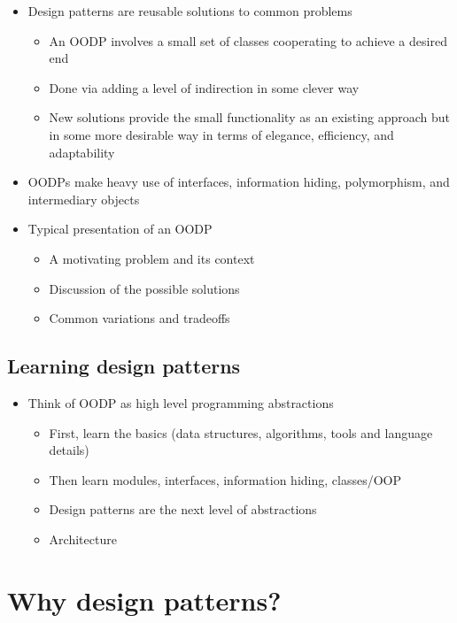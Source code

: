 \documentclass[12pt]{book}
\begin{document}
\begin{itemize}
  \item Design patterns are reusable solutions to common problems
  \begin{itemize}
    \item An OODP involves a small set of classes cooperating to achieve a desired end
    \item Done via adding a level of indirection in some clever way
    \item New solutions provide the small functionality as an existing approach but in some more desirable way in terms of elegance, efficiency, and adaptability
  \end{itemize} 

  \item OODPs make heavy use of interfaces, information hiding, polymorphism, and intermediary objects
  \item Typical presentation of an OODP
  \begin{itemize}
    \item A motivating problem and its context
    \item Discussion of the possible solutions 
    \item Common variations and tradeoffs
  \end{itemize} 
\end{itemize}

\subsection{Learning design patterns}

\begin{itemize}
  \item Think of OODP as high level programming abstractions
  \begin{itemize}
    \item First, learn the basics (data structures, algorithms, tools and language details)
    \item Then learn modules, interfaces, information hiding, classes/OOP
    \item Design patterns are the next level of abstractions
    \item Architecture
  \end{itemize} 
\end{itemize}

\section{Why design patterns?}
\end{document}
